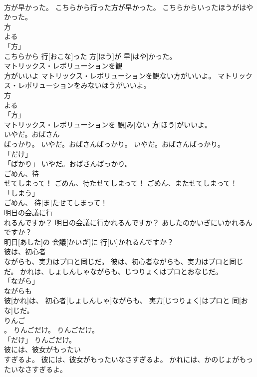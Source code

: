 \documentclass[8pt]{extreport}
\begin{document}
\begin{CJK}{UTF8}{min}
\\	方が早かった。	こちらから行った方が早かった。	こちらからいったほうがはやかった。	
\\	方 
\\	よる 
\\	「方」 
\\	こちらから 行[おこな]った 方[ほう]が 早[はや]かった。		
\\	マトリックス・レボリューションを観
\\	方がいいよ	マトリックス・レボリューションを観ない方がいいよ。	マトリックス・レボリューションをみないほうがいいよ。	
\\	方 
\\	よる 
\\	「方」 
\\	マトリックス・レボリューションを 観[み]ない 方[ほう]がいいよ。		
\\	いやだ。おばさん
\\	ばっかり。	いやだ。おばさんばっかり。	いやだ。おばさんばっかり。	
\\	「だけ」 
\\	「ばかり」	いやだ。おばさんばっかり。		
\\	ごめん、待
\\	せてしまって！	ごめん、待たせてしまって！	ごめん、またせてしまって！	
\\	「しまう」 
\\	ごめん、 待[ま]たせてしまって！		
\\	明日の会議に行
\\	れるんですか？	明日の会議に行かれるんですか？	あしたのかいぎにいかれるんですか？	
\\	明日[あした]の 会議[かいぎ]に 行[い]かれるんですか？		
\\	彼は、初心者
\\	ながらも、実力はプロと同じだ。	彼は、初心者ながらも、実力はプロと同じだ。	かれは、しょしんしゃながらも、じつりょくはプロとおなじだ。	
\\	「ながら」 
\\	ながらも 
\\	彼[かれ]は、 初心者[しょしんしゃ]ながらも、 実力[じつりょく]はプロと 同[おな]じだ。		
\\	りんご
\\	。	りんごだけ。	りんごだけ。	
\\	「だけ」	りんごだけ。		
\\	彼には、彼女がもったい
\\	すぎるよ。	彼には、彼女がもったいなさすぎるよ。	かれには、かのじょがもったいなさすぎるよ。	

\end{CJK}
\end{document}
